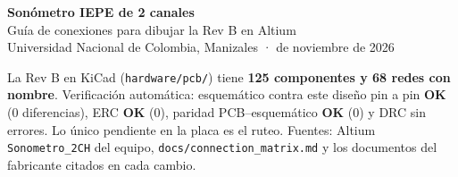 \documentclass[10pt,a4paper]{article}
\newcommand{\ok}{\textcolor{green!45!black}{\textbf{OK}}}
\begin{document}
\begin{center}
{\LARGE\bfseries Sonómetro IEPE de 2 canales}\\[4pt]
{\Large Guía de conexiones para dibujar la Rev B en Altium}\\[6pt]
Universidad Nacional de Colombia, Manizales \quad ·  de noviembre de 2026
\end{center}
\begin{tcolorbox}[colback=green!4,colframe=green!40!black,title=Estado verificado]
La Rev B en KiCad (\texttt{hardware/pcb/}) tiene \textbf{125 componentes y 68 redes con nombre}.
Verificación automática: esquemático contra este diseño pin a pin \ok{} (0 diferencias), ERC \ok{} (0),
paridad PCB–esquemático \ok{} (0) y DRC sin errores. Lo único pendiente en la placa es el ruteo.
Fuentes: Altium \texttt{Sonometro\_2CH} del equipo, \texttt{docs/connection\_matrix.md} y los documentos
del fabricante citados en cada cambio.
\end{tcolorbox}
\end{document}
